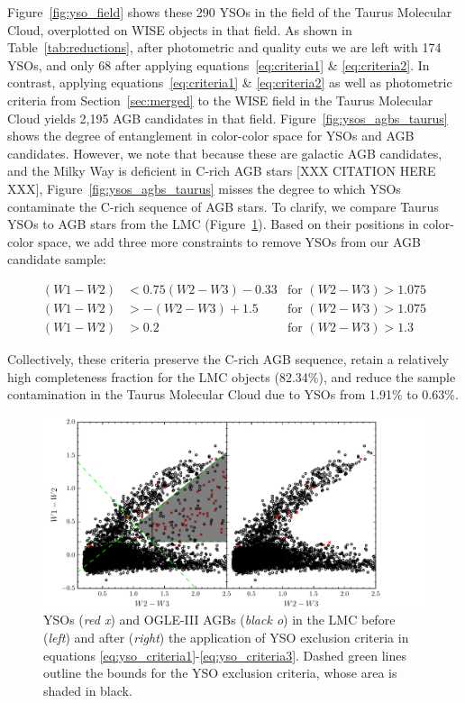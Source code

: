 Figure~\ref{fig:yso_field} shows these 290 YSOs in the field of the Taurus Molecular Cloud, overplotted on WISE objects in that field. As shown in Table~\ref{tab:reductions}, after photometric and quality cuts we are left with 174 YSOs, and only 68 after applying equations~\ref{eq:criteria1} \& \ref{eq:criteria2}. In contrast, applying equations~\ref{eq:criteria1} \& \ref{eq:criteria2} as well as photometric criteria from Section~\ref{sec:merged} to the WISE field in the Taurus Molecular Cloud yields 2,195 AGB candidates in that field. Figure~\ref{fig:ysos_agbs_taurus} shows the degree of entanglement in color-color space for YSOs and AGB candidates. However, we note that because these are galactic AGB candidates, and the Milky Way is deficient in C-rich AGB stars [XXX CITATION HERE XXX], Figure~\ref{fig:ysos_agbs_taurus} misses the degree to which YSOs contaminate the C-rich sequence of AGB stars. To clarify, we compare Taurus YSOs to AGB stars from the LMC (Figure~\ref{fig:ysos_lmc}). Based on their positions in color-color space, we add three more constraints to remove YSOs from our AGB candidate sample:

\begin{align}
(W1-W2) &< 0.75(W2-W3) - 0.33 & \text{for } (W2-W3) > 1.075\label{eq:yso_criteria1}\\
(W1-W2) &> -(W2-W3) + 1.5 & \text{for }(W2-W3) > 1.075\label{eq:yso_criteria2}\\
(W1-W2) &> 0.2 & \text{for }(W2-W3) > 1.3\label{eq:yso_criteria3}
\end{align}

Collectively, these criteria preserve the C-rich AGB sequence, retain a relatively high completeness fraction for the LMC objects (82.34\%), and reduce the sample contamination in the Taurus Molecular Cloud due to YSOs from 1.91\% to 0.63\%.

\begin{figure}[h]
\includegraphics[width=6.5in]{figs/remove_ysos.pdf}
\caption{YSOs (\emph{red x}) and OGLE-III AGBs (\emph{black o}) in the LMC before (\emph{left}) and after (\emph{right}) the application of YSO exclusion criteria in equations \ref{eq:yso_criteria1}-\ref{eq:yso_criteria3}. Dashed green lines outline the bounds for the YSO exclusion criteria, whose area is shaded in black.\label{fig:ysos_lmc}}
\end{figure}

